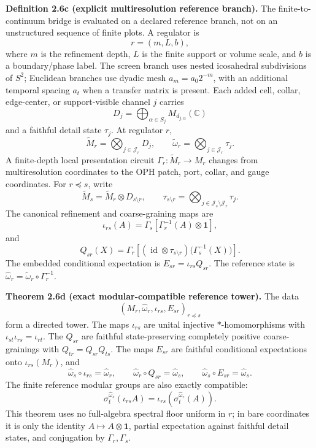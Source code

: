\textbf{Definition 2.6c (explicit multiresolution reference branch).}\label{def:explicit-multiresolution-reference-branch}
The finite-to-continuum bridge is evaluated on a declared reference branch, not on an
unstructured sequence of finite plots. A regulator is
\[
r=(m,L,b),
\]
where \(m\) is the refinement depth, \(L\) is the finite support or volume scale, and \(b\)
is a boundary/phase label. The screen branch uses nested icosahedral subdivisions of \(S^2\);
Euclidean branches use dyadic mesh \(a_m=a_0 2^{-m}\), with an additional temporal spacing
\(a_t\) when a transfer matrix is present. Each added cell, collar, edge-center, or
support-visible channel \(j\) carries
\[
D_j=\bigoplus_{\alpha\in S_j}M_{d_{j,\alpha}}(\mathbb C)
\]
and a faithful detail state \(\tau_j\). At regulator \(r\),
\[
\widetilde M_r=\bigotimes_{j\in\mathcal J_r}D_j,\qquad
\widetilde\omega_r=\bigotimes_{j\in\mathcal J_r}\tau_j .
\]
A finite-depth local presentation circuit \(\Gamma_r:\widetilde M_r\to M_r\) changes from
multiresolution coordinates to the OPH patch, port, collar, and gauge coordinates. For
\(r\preceq s\), write
\[
\widetilde M_s=\widetilde M_r\otimes D_{s\setminus r},\qquad
\tau_{s\setminus r}=\bigotimes_{j\in\mathcal J_s\setminus\mathcal J_r}\tau_j .
\]
The canonical refinement and coarse-graining maps are
\[
\iota_{rs}(A)=
\Gamma_s\!\left[\Gamma_r^{-1}(A)\otimes\mathbf1\right],
\]
and
\[
Q_{sr}(X)=
\Gamma_r\!\left[
(\operatorname{id}\otimes\tau_{s\setminus r})
\bigl(\Gamma_s^{-1}(X)\bigr)
\right].
\]
The embedded conditional expectation is \(E_{sr}=\iota_{rs}Q_{sr}\). The reference state is
\(\widehat\omega_r=\widetilde\omega_r\circ\Gamma_r^{-1}\).

\textbf{Theorem 2.6d (exact modular-compatible reference tower).}\label{thm:explicit-oph-reference-tower}
The data
\[
(M_r,\widehat\omega_r,\iota_{rs},E_{sr})_{r\preceq s}
\]
form a directed tower. The maps \(\iota_{rs}\) are unital injective
\(*\)-homomorphisms with \(\iota_{st}\iota_{rs}=\iota_{rt}\). The \(Q_{sr}\) are faithful
state-preserving completely positive coarse-grainings with \(Q_{tr}=Q_{sr}Q_{ts}\). The maps
\(E_{sr}\) are faithful conditional expectations onto \(\iota_{rs}(M_r)\), and
\[
\widehat\omega_s\circ\iota_{rs}=\widehat\omega_r,\qquad
\widehat\omega_r\circ Q_{sr}=\widehat\omega_s,\qquad
\widehat\omega_s\circ E_{sr}=\widehat\omega_s .
\]
The finite reference modular groups are also exactly compatible:
\[
\sigma_t^{\widehat\omega_s}(\iota_{rs}A)
=
\iota_{rs}(\sigma_t^{\widehat\omega_r}(A)).
\]
This theorem uses no full-algebra spectral floor uniform in \(r\); in bare coordinates it is only
the identity \(A\mapsto A\otimes\mathbf1\), partial expectation against faithful detail states,
and conjugation by \(\Gamma_r,\Gamma_s\).

